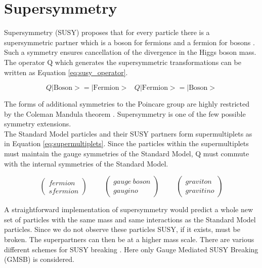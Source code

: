 \section{Supersymmetry}

Supersymmetry (SUSY) proposes that for every particle there is a supersymmetric 
partner which is a boson for fermions and a fermion for bosons \cite{primer}. 
Such a symmetry ensures cancellation of the divergence in the Higgs boson mass. 
The operator Q which generates the supersymmetric transformations can be written 
as Equation \ref{eq:susy_operator}.

\begin{equation}
Q|\mbox{Boson}> = |\mbox{Fermion}> \hspace{10pt} Q|\mbox{Fermion}> = |\mbox{Boson}>
\label{eq:susy_operator}
\end{equation}

The forms of additional symmetries to the Poincare group are highly restricted
by the Coleman Mandula theorem \cite{coleman}. Supersymmetry is one of the few
possible symmetry extensions. \\ 

The Standard Model particles and their SUSY partners form supermultiplets as in
Equation \ref{eq:supermultiplets}. Since the particles within the
supermultiplets must maintain the gauge symmetries of the Standard Model, Q must 
commute with the internal symmetries of the Standard Model.

\begin{equation}
\left(\begin{array}{c}fermion\\sfermion\end{array}\right) \hspace{1cm}
\left(\begin{array}{c}gauge\hspace{3pt}boson\\gaugino\end{array}\right) \hspace{1cm}
\left(\begin{array}{c}graviton\\gravitino\end{array}\right)
\label{eq:supermultiplets}
\end{equation}

A straightforward implementation of supersymmetry would predict a whole new set
of particles with the same mass and same interactions as the Standard Model
particles. Since we do not observe these particles SUSY, if it exists, must be 
broken. The superpartners can then be at a higher mass scale. There are various
different schemes for SUSY breaking \cite{atchinson}. Here only Gauge Mediated 
SUSY Breaking (GMSB) is considered. \\

